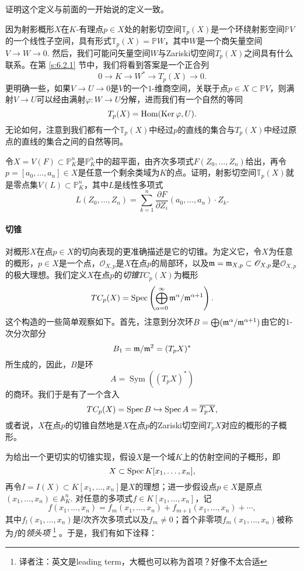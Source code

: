 \begin{exe}\label{exe:3.27}
	证明这个定义与前面的一开始说的\naive 定义一致。
\end{exe}

因为射影概形$X$在$K$-有理点$p\in X$处的射影切空间$\mathbb T_p(X)$是一个环绕射影空间$\mathbb PV$的一个线性子空间，具有形式$\mathbb T_p(X)=\mathbb PW$，其中$W$是一个商矢量空间$V\to W\to 0$. 然后，我们可能问矢量空间$W$与Zariski切空间$T_p(X)$之间具有什么联系。在第 \ref{s:6.2.1} 节中，我们将看到答案是一个正合列
\[
	0\longrightarrow K\longrightarrow W^* \longrightarrow T_p(X)\longrightarrow 0.
\]
更明确一些，如果$V\to U\to 0$是$V$的一个$1$-维商空间，关联于点$p\in X\subset \mathbb PV$，则满射$V\to U$可以经由满射$\varphi:W\to U$分解，进而我们有一个自然的等同
\[
	T_p(X)=\operatorname{Hom}(\operatorname{Ker}\varphi,U).
\]
无论如何，注意到我们都有一个$\mathbb T_p(X)$中经过$p$的直线的集合与$T_p(X)$中经过原点的直线的集合之间的自然等同。

\begin{exe}\label{exe:3.28}
	令$X=V(F)\subset \mathbb P_K^n$是$\mathbb P_K^n$中的超平面，由齐次多项式$F(Z_0,\dots,Z_n)$给出，再令$p=[a_0,\dots,a_n]\in X$是任意一个剩余类域为$K$的点。证明，射影切空间$\mathbb T_p(X)$就是零点集$V(L)\subset \mathbb P_K^n$，其中$L$是线性多项式
	\[
		L(Z_0,\dots,Z_n)=\sum_{k=1}^n\frac{\partial F}{\partial Z_i}(a_0,\dots,a_n)\cdot Z_k.
	\]
\end{exe}

\paragraph*{切锥}
对概形$X$在点$p\in X$的切向表现的更准确描述是它的切锥。为定义它，令$X$为任意的概形，$p\in X$是一个点，$\mathscr O_{X,p}$是$X$在点$p$的局部环，以及$\mathfrak{m}=\mathfrak{m}_{X,p}\subset \mathscr O_{X,p}$是$\mathscr O_{X,p}$的极大理想。我们定义$X$在点$p$的\textit{切锥}$TC_p(X)$为概形
\[
	TC_p(X)=\operatorname{Spec} \left(\bigoplus_{\alpha=0}^\infty \mathfrak{m}^\alpha/\mathfrak{m}^{\alpha+1}\right).
\]
这个构造的一些简单观察如下。首先，注意到分次环$B=\bigoplus (\mathfrak{m}^\alpha/\mathfrak{m}^{\alpha+1})$由它的$1$-次分次部分
\[
	B_1=\mathfrak{m}/\mathfrak{m}^2=(T_pX)^*
\]
所生成的，因此，$B$是环
\[
	A=\operatorname{Sym}((T_pX)^*)
\]
的商环。我们于是有了一个含入
\[
	TC_p(X)=\operatorname{Spec} B\hookrightarrow \operatorname{Spec} A=\overline{T_pX},
\]
或者说，$X$在点$p$的切锥自然地是$X$在点$p$的Zariski切空间$T_pX$对应的概形的子概形。

为给出一个更切实的切锥实现，假设$X$是一个域$K$上的仿射空间的子概形，即
\[
	X\subset \operatorname{Spec} K[x_1,\dots,x_n],
\]
再令$I=I(X)\subset K[x_1,\dots,x_n]$是$X$的理想；进一步假设点$p\in X$是原点$(x_1,\dots,x_n)\in \mathbb A_K^n$. 对任意的多项式$f\in K[x_1,\dots,x_n]$，记
\[
	f(x_1,\dots,x_n)=f_m(x_1,\dots,x_n)+f_{m+1}(x_1,\dots,x_n)+\cdots,
\]
其中$f_l(x_1,\dots,x_n)$是$l$次齐次多项式以及$f_m\neq 0$；首个非零项$f_m(x_1,\dots,x_n)$被称为$f$的\textit{领头项}%
\footnote{译者注：英文是leading term，大概也可以称为首项？好像不太合适}%
。于是，我们有如下诠释：

